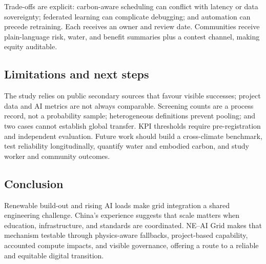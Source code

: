 \documentclass[12pt]{article}
\begin{document}
Trade-offs are explicit: carbon-aware scheduling can conflict with latency or data sovereignty; federated learning can complicate debugging; and automation can precede retraining. Each receives an owner and review date. Communities receive plain-language risk, water, and benefit summaries plus a contest channel, making equity auditable.

\subsection{Limitations and next steps}
The study relies on public secondary sources that favour visible successes; project data and AI metrics are not always comparable. Screening counts are a process record, not a probability sample; heterogeneous definitions prevent pooling; and two cases cannot establish global transfer. KPI thresholds require pre-registration and independent evaluation. Future work should build a cross-climate benchmark, test reliability longitudinally, quantify water and embodied carbon, and study worker and community outcomes.

\subsection{Conclusion}
Renewable build-out and rising AI loads make grid integration a shared engineering challenge. China's experience suggests that scale matters when education, infrastructure, and standards are coordinated. NE--AI Grid makes that mechanism testable through physics-aware fallbacks, project-based capability, accounted compute impacts, and visible governance, offering a route to a reliable and equitable digital transition.
\end{document}
